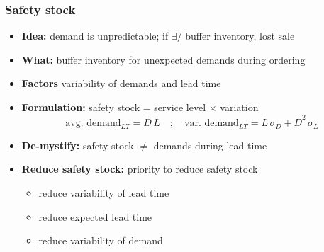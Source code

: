 \documentclass[10pt,handout,notes=show]{beamer}
\begin{document}
  \begin{frame}
  \frametitle{Safety stock}

  \begin{itemize}
    \item \textbf{Idea:} demand is unpredictable; if $\exists \!\!\!/$ buffer inventory, lost sale
    \item \textbf{What:} buffer inventory for \alert{unexpected demands} during ordering
    \item \textbf{Factors} \alert{variability} of demands and lead time
    \item \textbf{Formulation:} safety stock = \alert{service level} $\times$ \alert{variation}
    \[ \mbox{avg. demand$_{LT}$} =  \bar{D} \,\bar{L} \quad ; \quad \mbox{var. demand$_{LT}$} = \bar{L} \,\sigma_D + \bar{D}^2 \,\sigma_L \]
    \item \textbf{De-mystify:} safety stock $\neq$ demands during lead time
    \item \textbf{Reduce safety stock:} priority to reduce safety stock
    \begin{itemize}
      \item reduce \alert{variability} of lead time
      \item reduce \alert{expected} lead time
      \item reduce \alert{variability} of demand
    \end{itemize}
  \end{itemize}


  \end{frame}
\end{document}

